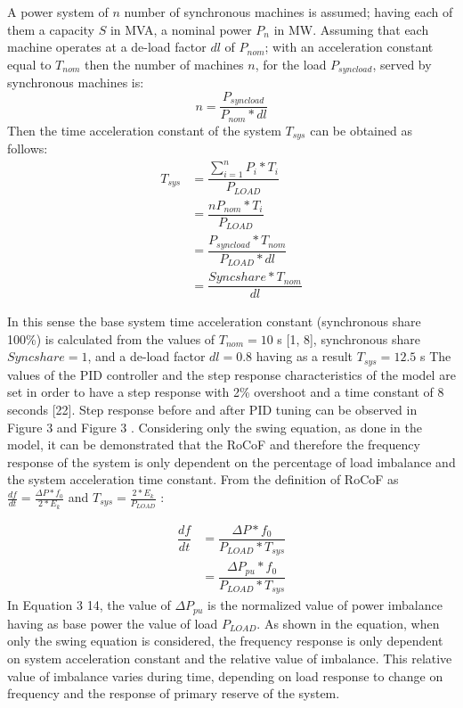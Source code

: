 A power system of $ n $ number of synchronous machines is assumed; having each of them a capacity $ S $ in MVA, a nominal power $ P_n $ in MW.
Assuming that each machine operates at a de-load factor $ dl $ of $ P_{nom} $; with an acceleration constant equal to $ T_{nom} $ then the number of machines $ n $, for the load $ P_{syncload} $, served by synchronous machines is:
\begin{equation}
	n=\dfrac{P_{syncload}}{P_{nom}*dl}
\end{equation}
Then the time acceleration constant of the system $ T_{sys} $ can be obtained as follows:
\begin{align}
	T_{sys} &=\dfrac{\sum_{i=1}^nP_i*T_i}{P_{LOAD}}\nonumber  \\ 
	 &=\dfrac{nP_{nom}*T_i}{P_{LOAD}}\nonumber \\
	&=\dfrac{P_{syncload}*T_{nom}}{P_{LOAD}*dl}\nonumber\\	
		&=\dfrac{Sync share*T_{nom}}{dl} \label{eq:tsyseuro}
\end{align}




In this sense the base system time acceleration constant (synchronous share 100\%) is calculated from the values of $ T_{nom}=10 $ s [1, 8], synchronous share $ Sync share=1 $, and a de-load factor $ dl=0.8 $ having as a result $ T_{sys}=12.5 $ s
The values of the PID controller and the step response characteristics of the model are set in order to have a step response with 2\% overshoot and a time constant of 8 seconds [22]. Step response before and after PID tuning can be observed in Figure 3  and Figure 3 .
Considering only the swing equation, as done in the model, it can be demonstrated that the RoCoF and therefore the frequency response of the system is only dependent on the percentage of load imbalance and the system acceleration time constant.
From the definition of RoCoF as $ \frac{df}{dt}=\frac{\Delta P*f_0}{2*E_k} $ and  $ T_{sys}=\frac{2*E_k}{P_{LOAD}} $ :

\begin{align}
	\dfrac{df}{dt} &=\dfrac{\Delta P*f_0}{P_{LOAD}*T_{sys}} \nonumber\\
	&=\dfrac{\Delta P_{pu}*f_0}{P_{LOAD}*T_{sys}}
\end{align}
In Equation 3 14, the value of $ \Delta P_{pu} $ is the normalized value of power imbalance having as base power the value of load $ P_{LOAD} $. As shown in the equation, when only the swing equation is considered, the frequency response is only dependent on system acceleration constant and the relative value of imbalance. This relative value of imbalance varies during time, depending on load response to change on frequency and the response of primary reserve of the system.


